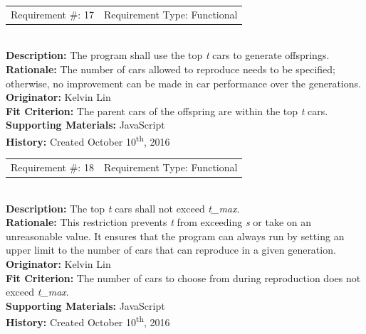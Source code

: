 \documentclass[12pt, titlepage]{article}
\begin{document}
\begin{reqbox}
%
\begin{tabular}{cc}
Requirement \#: 17 & Requirement Type: Functional \\
\end{tabular} \\
%
\textbf{Description:} The program shall use the top \textit{t} cars to generate 
offsprings. \\
\textbf{Rationale:} The number of cars allowed to reproduce needs to be 
specified; otherwise, no improvement can be made in car performance over the 
generations. \\
\textbf{Originator:} Kelvin Lin\\
\textbf{Fit Criterion:} The parent cars of the offspring are within the top 
\textit{t} cars.\\
%  
\textbf{Supporting Materials:} JavaScript \\
\textbf{History:} Created October 10\textsuperscript{th}, 2016
%
\end{reqbox}

\begin{reqbox}
%
\begin{tabular}{cc}
Requirement \#: 18 & Requirement Type: Functional \\
\end{tabular} \\
%
\textbf{Description:} The top \textit{t} cars shall not exceed \textit{t\_max}. 
\\
\textbf{Rationale:} This restriction prevents \textit{t} from exceeding 
\textit{s} or take on an unreasonable value. It ensures that the program can 
always run by setting an upper limit to the number of cars that can reproduce in 
a given generation. \\
\textbf{Originator:} Kelvin Lin\\
\textbf{Fit Criterion:} The number of cars to choose from during reproduction 
does not exceed \textit{t\_max}.\\
%  
\textbf{Supporting Materials:} JavaScript \\
\textbf{History:} Created October 10\textsuperscript{th}, 2016
%
\end{reqbox}
\end{document}
